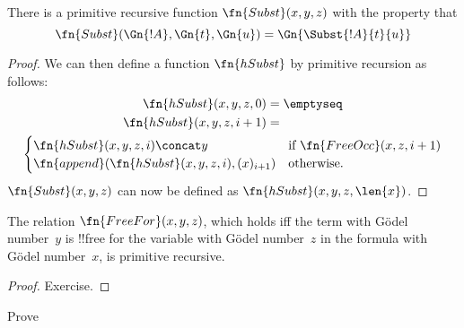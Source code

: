\documentclass[../../../include/open-logic-section]{subfiles}
\begin{document}

\begin{prop}
There is a primitive recursive function $\fn{Subst}(x, y, z)$ with the
property that
\[
\fn{Subst}(\Gn{!A}, \Gn{t}, \Gn{u}) = \Gn{\Subst{!A}{t}{u}}
\]
\end{prop}

\begin{proof}
We can then define a function $\fn{hSubst}$ by primitive recursion as
follows:
\begin{multline*}
\begin{aligned}
\fn{hSubst}(x, y, z, 0) & = \emptyseq \\
\fn{hSubst}(x, y, z, i+1) & =
\end{aligned}\\
\begin{cases}
\fn{hSubst}(x, y, z, i) \concat y & \text{if $\fn{FreeOcc}(x, z, i+1)$} \\
\fn{append}(\fn{hSubst}(x, y, z, i), (x)_{i+1}) & \text{otherwise.}
\end{cases}
\end{multline*}
$\fn{Subst}(x, y, z)$ can now be defined as $\fn{hSubst}(x, y, z, \len{x})$.
\end{proof}

\begin{prop}
The relation $\fn{FreeFor}(x, y, z)$, which holds iff the term with
G\"odel number~$y$ is !!{free for} the variable with G\"odel
number~$z$ in the formula with G\"odel number~$x$, is primitive
recursive.
\end{prop}

\begin{proof} Exercise. \end{proof}

\begin{prob}
Prove 
\end{prob}
\end{document}
